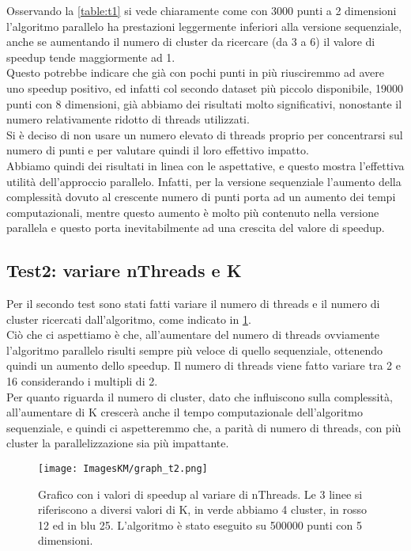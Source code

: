 \documentclass[10pt,twocolumn,letterpaper]{article}
\begin{document}
Osservando la \cref{table:t1} si vede chiaramente come con 3000 punti a 2 dimensioni l'algoritmo parallelo ha prestazioni leggermente inferiori alla versione sequenziale, anche se aumentando il numero di cluster da ricercare (da 3 a 6) il valore di speedup tende maggiormente ad 1.\\
Questo potrebbe indicare che già con pochi punti in più riusciremmo ad avere uno speedup positivo, ed infatti col secondo dataset più piccolo disponibile, 19000 punti con 8 dimensioni, già abbiamo dei risultati molto significativi, nonostante il numero relativamente ridotto di threads utilizzati.\\
Si è deciso di non usare un numero elevato di threads proprio per concentrarsi sul numero di punti e per valutare quindi il loro effettivo impatto.\\
Abbiamo quindi dei risultati in linea con le aspettative, e questo mostra l'effettiva utilità dell'approccio parallelo. Infatti, per la versione sequenziale l'aumento della complessità dovuto al crescente numero di punti porta ad un aumento dei tempi computazionali, mentre questo aumento è molto più contenuto nella versione parallela e questo porta inevitabilmente ad una crescita del valore di speedup.

\subsection{Test2: variare nThreads e K}
\label{sec:t2}
Per il secondo test sono stati fatti variare il numero di threads e il numero di cluster ricercati dall'algoritmo, come indicato in \cref{fig:t2}.\\
Ciò che ci aspettiamo è che, all'aumentare del numero di threads ovviamente l'algoritmo parallelo risulti sempre più veloce di quello sequenziale, ottenendo quindi un aumento dello speedup. Il numero di threads viene fatto variare tra 2 e 16 considerando i multipli di 2.\\
Per quanto riguarda il numero di cluster, dato che influiscono sulla complessità, all'aumentare di K crescerà anche il tempo computazionale dell'algoritmo sequenziale, e quindi ci aspetteremmo che, a parità di numero di threads, con più cluster la parallelizzazione sia più impattante.

\begin{figure}[h]
    \centering
    \texttt{[image: ImagesKM/graph\_t2.png]}
    \caption{Grafico con i valori di speedup al variare di nThreads. Le 3 linee si riferiscono a diversi valori di K, in verde abbiamo 4 cluster, in rosso 12 ed in blu 25. L'algoritmo è stato eseguito su 500000 punti con 5 dimensioni.}
    \label{fig:t2}
\end{figure}
\end{document}
